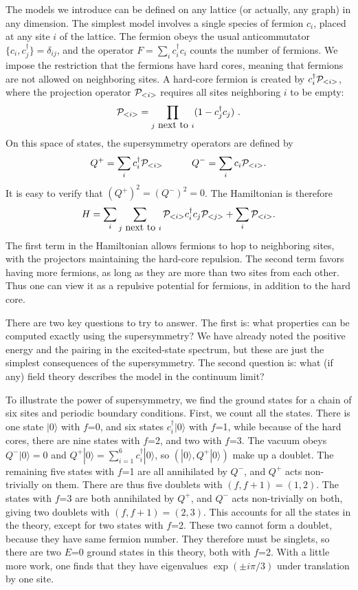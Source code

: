 \documentclass[a4paper,prl,aps,twocolumn]{revtex4}
\begin{document}
The models we introduce can be defined on any lattice
(or actually, any graph) in any dimension. The simplest model involves
a single species of fermion $c_i$, placed at any site $i$ of the
lattice. The fermion obeys the usual anticommutator
$\{c_i,c^\dagger_j\}=\delta_{ij}$, and the operator $F=\sum_i
c^\dagger_i c_i$ counts the number of fermions.  We impose the
restriction that the fermions have hard cores, meaning that fermions
are not allowed on neighboring sites.
A hard-core fermion is created by
$c^\dagger_i {\cal P}_{<i>}$, where the projection
operator ${\cal P}_{<i>}$ requires all sites
neighboring $i$ to be empty:
\begin{equation}  
{\cal P}_{<i>}= \prod_{j\hbox{ next to } i} (1-c^\dagger_j c_j) \ .  
\end{equation}  
On this space of states, the supersymmetry
operators are defined by
\begin{equation}  
Q^+=\sum_i c^\dagger_i {\cal P}_{<i>} \qquad\quad  
Q^-=\sum_i c_i {\cal P}_{<i>}.  
\label{susydef}  
\end{equation}  
It is easy to verify that $(Q^+)^2=(Q^-)^2=0$.
The Hamiltonian is therefore
\begin{equation}  
H= \sum_i \sum_{j\hbox{ next to }i} {\cal P}_{<i>} c^\dagger_i   
c_j {\cal P}_{<j>} + \sum_i {\cal P}_{<i>}.
\label{ham}  
\end{equation}
The first term in the Hamiltonian allows fermions to hop to
neighboring sites, with the projectors maintaining the hard-core
repulsion. The second term favors having more fermions, as long
as they are more than two sites from each other. Thus one can
view it as a repulsive potential for fermions, 
in addition to the hard core.
  
There are two key questions to try to answer. The first is:
what properties can be computed exactly using the supersymmetry? 
We have already noted the positive energy and 
the pairing in the excited-state spectrum,
but these are just the simplest consequences of the supersymmetry.
The second question is: what (if any) field theory
describes the model in the continuum limit?

To illustrate the power of supersymmetry, we find the ground states
for a chain of six sites and periodic boundary conditions.  First, we
count all the states. There is one state $|0\rangle$ with $f$=0, and
six states $c_i^\dagger|0\rangle$ with $f$=1, while because of the
hard cores, there are nine states with $f$=2, and two with $f$=3. The
vacuum obeys $Q^-|0\rangle= 0$ and $Q^+|0\rangle =\sum_{i=1}^6
c_i^\dagger|0\rangle$, so $(|0\rangle,Q^+|0\rangle)$ make up a
doublet. The remaining five states with $f$=1 are all annihilated by
$Q^-$, and $Q^+$ acts non-trivially on them. There are thus
five doublets with $(f,f+1)=(1,2)$. The states with $f$=3 are both
annihilated by $Q^+$, and $Q^-$ acts non-trivially on both, giving two
doublets with $(f,f+1)=(2,3)$. This accounts for all the states in the
theory, except for two states with $f$=2.  These two cannot form a
doublet, because they have same fermion number.  They therefore must
be singlets, so there are two $E$=0 ground states in this theory, both
with $f$=2.  With a little more work, one
finds that they have eigenvalues $\exp(\pm i\pi/ 3)$ under translation
by one site. 
\end{document}
